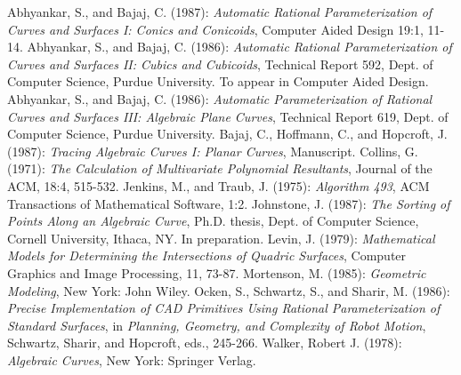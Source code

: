 \begin{thebibliography}{The longest is long}
%
 Abhyankar, S., and Bajaj, C. (1987):
{\em Automatic Rational Parameterization of Curves and Surfaces I:
Conics and Conicoids}, Computer Aided Design
19:1, 11-14.
%
 Abhyankar, S., and Bajaj, C. (1986):
{\em Automatic Rational Parameterization of Curves and Surfaces II:
Cubics and Cubicoids},
Technical Report 592, Dept. of Computer Science, 
Purdue University.
To appear in Computer Aided Design.
% 
 Abhyankar, S., and Bajaj, C. (1986):
{\em Automatic Parameterization of Rational Curves and Surfaces III: 
Algebraic Plane Curves},
Technical Report 619, Dept. of Computer Science, 
Purdue University.
%
 Bajaj, C., Hoffmann, C., and Hopcroft, J. (1987):
{\em Tracing Algebraic Curves I: Planar Curves}, Manuscript.
%
 Collins, G. (1971):
{\em The Calculation of Multivariate Polynomial Resultants},
Journal of the ACM, 18:4, 515-532.
%
 Jenkins, M., and Traub, J. (1975):
{\em Algorithm 493}, ACM Transactions of Mathematical Software, 1:2.
%
 Johnstone, J. (1987):
{\em The Sorting of Points Along an Algebraic Curve},
Ph.D. thesis, Dept. of Computer Science, Cornell University,
Ithaca, NY. In preparation.  
%
 Levin, J. (1979):
{\em Mathematical Models for Determining the Intersections of Quadric Surfaces},
Computer Graphics and Image Processing, 11, 73-87.
%
 Mortenson, M. (1985):
{\em Geometric Modeling},
New York: John Wiley.
%
 Ocken, S., Schwartz, S., and Sharir, M. (1986):
{\em Precise Implementation of CAD Primitives Using Rational Parameterization 
of Standard Surfaces}, in {\em Planning, Geometry, and Complexity of Robot
Motion}, Schwartz, Sharir, and Hopcroft, eds., 245-266.
%
 Walker, Robert J. (1978):
{\em Algebraic Curves},
New York: Springer Verlag.
\end{thebibliography}

